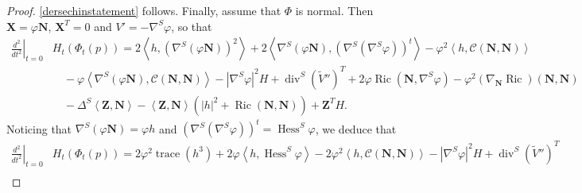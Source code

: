 \documentclass[11pt]{amsart}
\newcommand{\n}[1]{\nabla^\varepsilon_{ #1 }}
\renewcommand{\j}{\mathcal{C}}
\newcommand{\X}{\mathbf{X}}
\newcommand{\Z}{\mathbf{Z}}
\renewcommand{\n}{\mathbf{N}}
\DeclareMathOperator{\ric}{Ric}
\DeclareMathOperator{\divv}{div}
\DeclareMathOperator{\trace}{trace}
\DeclareMathOperator{\hess}{Hess}
\theoremstyle{definition}
\theoremstyle{remark}
\numberwithin{equation}{section}
\begin{document}
\begin{proof}
\eqref{dersechinstatement} follows. Finally, assume that $\Phi$ is normal. Then $\X=\varphi\n$, $\X^T=0$ and $V'=-\nabla^S\varphi$, so that
\begin{equation*}
    \begin{split}
         \left.\frac{d^2}{dt^2}\right|_{t=0}&H_t\left(\Phi_t(p)\right)=2\left\langle h,\left(\nabla^S \left(\varphi\n\right)\right)^2\right\rangle+2\left\langle \nabla^S \left(\varphi\n\right),\left(\nabla^S\left(\nabla^S\varphi\right)\right)^t\right\rangle-\varphi^2\left\langle h,\j(\n,\n)\right\rangle\\
         &\quad-\varphi\left\langle\nabla^S \left(\varphi\n\right),\j(\n,\n)\right\rangle-\left|\nabla^S\varphi\right|^2H+\divv^S\left( \tilde V''\right)^T+2\varphi\ric(\n,\nabla^S\varphi)-\varphi^2\left(\nabla_\n \ric\right)(\n,\n)\\
         &\quad -\Delta^S\left \langle\Z,\n\right\rangle-\left\langle\Z,\n\right\rangle\left(|h|^2+\ric(\n,\n)\right)+\Z^T H.
    \end{split}
\end{equation*}
Noticing that $\nabla^S\left(\varphi\n\right)=\varphi h$ and $\left(\nabla^S\left(\nabla^S\varphi\right)\right)^t=\hess^S\varphi$, we deduce that
\begin{equation*}
        \begin{split}
                \left.\frac{d^2}{dt^2}\right|_{t=0}&H_t\left(\Phi_t(p)\right)=2\varphi^2\trace\left(h^3\right)+2\varphi\left\langle h,\hess^S\varphi\right\rangle-2\varphi^2\left\langle h,\j(\n,\n)\right\rangle-\left|\nabla^S\varphi\right|^2H+\divv^S\left( \tilde V''\right)^T\\

\end{split}
\end{equation*}
\end{proof}
\end{document}
